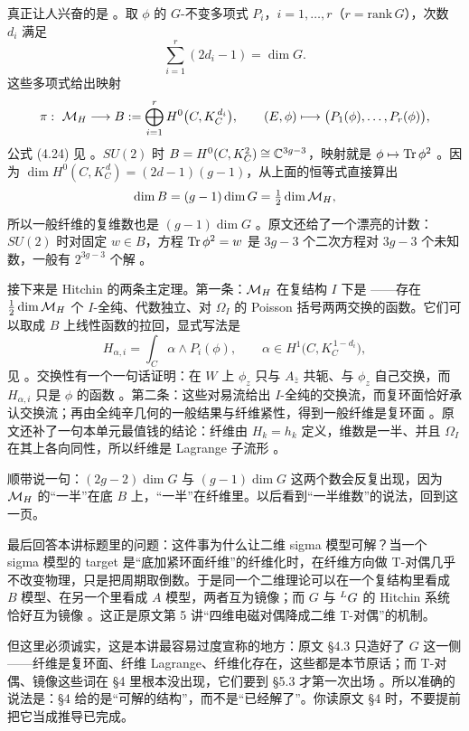 真正让人兴奋的是 。取 $\phi$ 的 $G$-不变多项式 $P_i$，$i=1,\dots,r$（$r=\mathrm{rank}\,G$），次数 $d_i$ 满足
\[
\sum_{i=1}^{r}(2d_i-1)=\dim G .
\]
这些多项式给出映射
\[
\pi:\ \mathcal{M}_{H}\longrightarrow B:=\bigoplus_{i=1}^{r}H^0\bigl(C,K_C^{\,d_i}\bigr),
\qquad (E,\phi)\longmapsto\bigl(P_1(\phi),\dots,P_r(\phi)\bigr),
\]
公式 (4.24) 见 。$SU(2)$ 时 $B=H^0(C,K_C^2)\cong\mathbb{C}^{3g-3}$，映射就是 $\phi\mapsto\operatorname{Tr}\phi^2$ 。因为 $\dim H^0(C,K_C^{\,d})=(2d-1)(g-1)$，从上面的恒等式直接算出
\[
\dim B=(g-1)\dim G=\tfrac12\dim \mathcal{M}_{H} ,
\]
所以一般纤维的复维数也是 $(g-1)\dim G$ 。原文还给了一个漂亮的计数：$SU(2)$ 时对固定 $w\in B$，方程 $\operatorname{Tr}\phi^2=w$ 是 $3g-3$ 个二次方程对 $3g-3$ 个未知数，一般有 $2^{3g-3}$ 个解 。

接下来是 Hitchin 的两条主定理。第一条：$\mathcal{M}_{H}$ 在复结构 $I$ 下是 ——存在 $\tfrac12\dim\mathcal{M}_{H}$ 个 $I$-全纯、代数独立、对 $\Omega_I$ 的 Poisson 括号两两交换的函数。它们可以取成 $B$ 上线性函数的拉回，显式写法是
\[
H_{\alpha,i}=\int_C \alpha\wedge P_i(\phi),\qquad \alpha\in H^1\bigl(C,K_C^{\,1-d_i}\bigr),
\]
见 。交换性有一个一句话证明：在 $W$ 上 $\phi_z$ 只与 $A_{\bar z}$ 共轭、与 $\phi_z$ 自己交换，而 $H_{\alpha,i}$ 只是 $\phi$ 的函数 。第二条：这些对易流给出 $I$-全纯的交换流，而复环面恰好承认交换流；再由全纯辛几何的一般结果与纤维紧性，得到一般纤维是复环面 。原文还补了一句本单元最值钱的结论：纤维由 $H_k=h_k$ 定义，维数是一半、并且 $\Omega_I$ 在其上各向同性，所以纤维是 Lagrange 子流形 。

顺带说一句：$(2g-2)\dim G$ 与 $(g-1)\dim G$ 这两个数会反复出现，因为 $\mathcal{M}_{H}$ 的“一半”在底 $B$ 上，“一半”在纤维里。以后看到“一半维数”的说法，回到这一页。

最后回答本讲标题里的问题：这件事为什么让二维 sigma 模型可解？当一个 sigma 模型的 target 是“底加紧环面纤维”的纤维化时，在纤维方向做 T-对偶几乎不改变物理，只是把周期取倒数。于是同一个二维理论可以在一个复结构里看成 $B$ 模型、在另一个里看成 $A$ 模型，两者互为镜像；而 $G$ 与 ${}^{L}G$ 的 Hitchin 系统恰好互为镜像 \cite{w08}。这正是原文第 5 讲“四维电磁对偶降成二维 T-对偶”的机制。

但这里必须诚实，这是本讲最容易过度宣称的地方：原文 §4.3 只造好了 $G$ 这一侧——纤维是复环面、纤维 Lagrange、纤维化存在，这些都是本节原话；而 T-对偶、镜像这些词在 §4 里根本没出现，它们要到 §5.3 才第一次出场 。所以准确的说法是：§4 给的是“可解的结构”，而不是“已经解了”。你读原文 §4 时，不要提前把它当成推导已完成。

